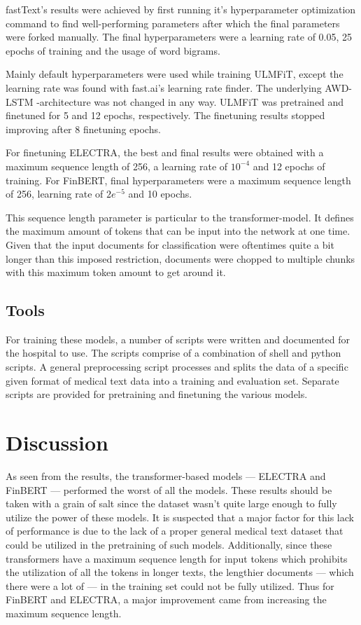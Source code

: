 fastText's results were achieved by first running it's hyperparameter optimization command to find well-performing parameters after which the final parameters were forked manually.
The final hyperparameters were a learning rate of 0.05, 25 epochs of training and the usage of word bigrams.

Mainly default hyperparameters were used while training ULMFiT, except the learning rate was found with fast.ai's learning rate finder.
The underlying AWD-LSTM -architecture was not changed in any way.
ULMFiT was pretrained and finetuned for 5 and 12 epochs, respectively.
The finetuning results stopped improving after 8 finetuning epochs.

For finetuning ELECTRA, the best and final results were obtained with a maximum sequence length of 256, a learning rate of $10^{-4}$ and 12 epochs of training.
For FinBERT, final hyperparameters were a maximum sequence length of 256, learning rate of $2e^{-5}$ and 10 epochs.

This sequence length parameter is particular to the transformer-model.
It defines the maximum amount of tokens that can be input into the network at one time.
Given that the input documents for classification were oftentimes quite a bit longer than this imposed restriction, documents were chopped to multiple chunks with this maximum token amount to get around it.

\subsection{Tools}\label{Tools}
For training these models, a number of scripts were written and documented for the hospital to use.
The scripts comprise of a combination of shell and python scripts.
A general preprocessing script processes and splits the data of a specific given format of medical text data into a training and evaluation set.
Separate scripts are provided for pretraining and finetuning the various models.


\section{Discussion}\label{Discussion}
As seen from the results, the transformer-based models --- ELECTRA and FinBERT --- performed the worst of all the models.
These results should be taken with a grain of salt since the dataset wasn't quite large enough to fully utilize the power of these models.
It is suspected that a major factor for this lack of performance is due to the lack of a proper general medical text dataset that could be utilized in the pretraining of such models.
Additionally, since these transformers have a maximum sequence length for input tokens which prohibits the utilization of all the tokens in longer texts, the lengthier documents --- which there were a lot of --- in the training set could not be fully utilized.
Thus for FinBERT and ELECTRA, a major improvement came from increasing the maximum sequence length.


